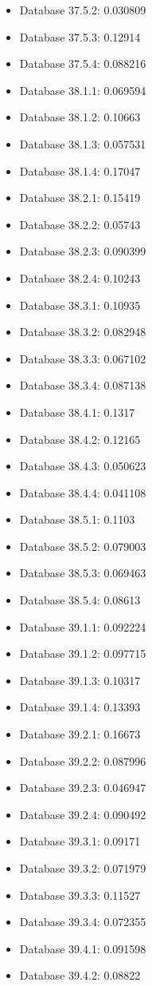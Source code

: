 \begin{itemize}
\item Database 37.5.2: 0.030809
\item Database 37.5.3: 0.12914
\item Database 37.5.4: 0.088216
\item Database 38.1.1: 0.069594
\item Database 38.1.2: 0.10663
\item Database 38.1.3: 0.057531
\item Database 38.1.4: 0.17047
\item Database 38.2.1: 0.15419
\item Database 38.2.2: 0.05743
\item Database 38.2.3: 0.090399
\item Database 38.2.4: 0.10243
\item Database 38.3.1: 0.10935
\item Database 38.3.2: 0.082948
\item Database 38.3.3: 0.067102
\item Database 38.3.4: 0.087138
\item Database 38.4.1: 0.1317
\item Database 38.4.2: 0.12165
\item Database 38.4.3: 0.050623
\item Database 38.4.4: 0.041108
\item Database 38.5.1: 0.1103
\item Database 38.5.2: 0.079003
\item Database 38.5.3: 0.069463
\item Database 38.5.4: 0.08613
\item Database 39.1.1: 0.092224
\item Database 39.1.2: 0.097715
\item Database 39.1.3: 0.10317
\item Database 39.1.4: 0.13393
\item Database 39.2.1: 0.16673
\item Database 39.2.2: 0.087996
\item Database 39.2.3: 0.046947
\item Database 39.2.4: 0.090492
\item Database 39.3.1: 0.09171
\item Database 39.3.2: 0.071979
\item Database 39.3.3: 0.11527
\item Database 39.3.4: 0.072355
\item Database 39.4.1: 0.091598
\item Database 39.4.2: 0.08822

\end{itemize}

